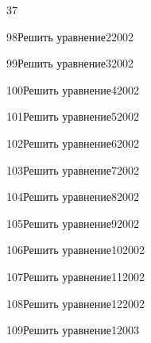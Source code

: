\begin{TrigSourcePage}{37}
\begin{TrigExercise}{98}{Решить уравнение}{2}{2002}
\end{TrigExercise}
\begin{TrigExercise}{99}{Решить уравнение}{3}{2002}
\end{TrigExercise}
\begin{TrigExercise}{100}{Решить уравнение}{4}{2002}
\end{TrigExercise}
\begin{TrigExercise}{101}{Решить уравнение}{5}{2002}
\end{TrigExercise}
\begin{TrigExercise}{102}{Решить уравнение}{6}{2002}
\end{TrigExercise}
\begin{TrigExercise}{103}{Решить уравнение}{7}{2002}
\end{TrigExercise}
\begin{TrigExercise}{104}{Решить уравнение}{8}{2002}
\end{TrigExercise}
\begin{TrigExercise}{105}{Решить уравнение}{9}{2002}
\end{TrigExercise}
\begin{TrigExercise}{106}{Решить уравнение}{10}{2002}
\end{TrigExercise}
\begin{TrigExercise}{107}{Решить уравнение}{11}{2002}
\end{TrigExercise}
\begin{TrigExercise}{108}{Решить уравнение}{12}{2002}
\end{TrigExercise}
\begin{TrigExercise}{109}{Решить уравнение}{1}{2003}

\end{TrigExercise}
\end{TrigSourcePage}

